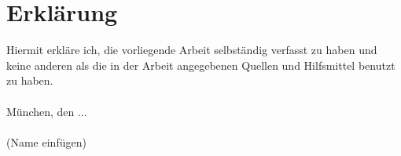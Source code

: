 \section*{Erklärung}

Hiermit erkläre ich, die vorliegende Arbeit selbständig verfasst zu haben und keine anderen als die in der Arbeit angegebenen Quellen und Hilfsmittel benutzt zu haben.\\
\\ München, den ...\\
\vspace{1.5cm}
\\(Name einfügen)
